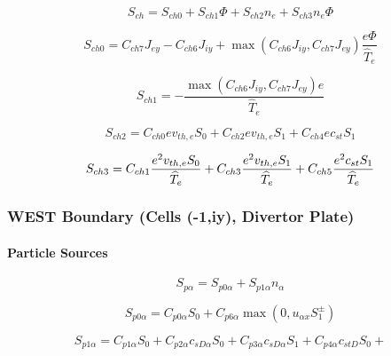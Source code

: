 \documentclass[11pt]{article}
\begin{document}
\begin{equation}
S_{ch}=S_{ch0}+S_{ch1}\Phi+S_{ch2}n_{e}+S_{ch3}n_{e}\Phi   \label{62}
\end{equation}

\begin{equation}
S_{ch0}=C_{ch7}J_{ey}-C_{ch6}J_{iy}+\max\left(
C_{ch6}J_{iy},C_{ch7}J_{ey}\right) \frac{e\Phi}{\widehat{T}_{e}}   \label{63}
\end{equation}
\bigskip

\begin{equation}
S_{ch1}=-\frac{\max\left( C_{ch6}J_{iy},C_{ch7}J_{ey}\right) e}{\widehat
{T}_{e}}   \label{64}
\end{equation}

\begin{equation}
S_{ch2}=C_{ch0}ev_{th,e}S_{0}+C_{ch2}ev_{th,e}S_{1}+C_{ch4}ec_{st}S_{1} 
\label{65}
\end{equation}

\begin{equation}
S_{ch3}=C_{ch1}\frac{e^{2}v_{th,e}S_{0}}{\widehat{T}_{e}}+C_{ch3}\frac
{e^{2}v_{th,e}S_{1}}{\widehat{T}_{e}}+C_{ch5}\frac{e^{2}c_{st}S_{1}}{%
\widehat{T}_{e}}   \label{66}
\end{equation}

\bigskip\bigskip

\subsubsection{WEST Boundary (Cells (-1,iy), Divertor Plate)}

\bigskip

\paragraph{Particle Sources}

\begin{equation}
S_{p\alpha}=S_{p0\alpha}+S_{p1\alpha}n_{\alpha}   \label{67}
\end{equation}

\begin{equation}
S_{p0\alpha}=C_{p0\alpha}S_{0}+C_{p6\alpha}\max\left( 0,u_{\alpha
x}S_{1}^{\pm}\right)   \label{68}
\end{equation}

\begin{equation*}
S_{p1\alpha}=C_{p1\alpha}S_{0}+C_{p2\alpha}c_{sD\alpha}S_{0}+C_{p3\alpha
}c_{sD\alpha}S_{1}+C_{p4\alpha}c_{stD}S_{0}+ 
\end{equation*}
\end{document}
